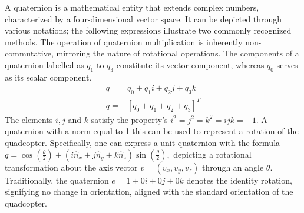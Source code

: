 \documentclass{article}
\begin{document}
A quaternion is a mathematical entity that extends complex numbers, characterized by a four-dimensional vector space. It can be depicted through various notations; the following expressions illustrate two commonly recognized methods. The operation of quaternion multiplication is inherently non-commutative, mirroring the nature of rotational operations. 
The components of a quaternion labelled as \( q_1 \) to \( q_3 \) constitute its vector component, whereas \( q_0 \) serves as its scalar component.
\begin{align}
  q =& q_0 + {q_1}i + {q_2}j + {q_3}k \\
  q =& [q_0 + q_1 + q_2 + q_3]^T
\end{align}
The elements \(i , j\) and \(k\) satisfy the property's \( i^2 = j^2 = k^2 = ijk = -1 \). A quaternion with a norm equal to 1 this can be used to represent a rotation of the quadcopter. Specifically, one can express a unit quaternion with the formula \( q = \cos \left(\frac{\theta}{2}\right) + \left(i\hat{n}_x + j\hat{n}_y + k\hat{n}_z\right) \sin \left(\frac{\theta}{2}\right), \) depicting a rotational transformation about the axis 
vector \(v = (v_x, v_y, v_z) \) through an angle \( \theta \). Traditionally, the quaternion \(e = 1 + 0i + 0j + 0k \) denotes the identity rotation, signifying no change in orientation, aligned with the standard orientation of the quadcopter.
\end{document}
